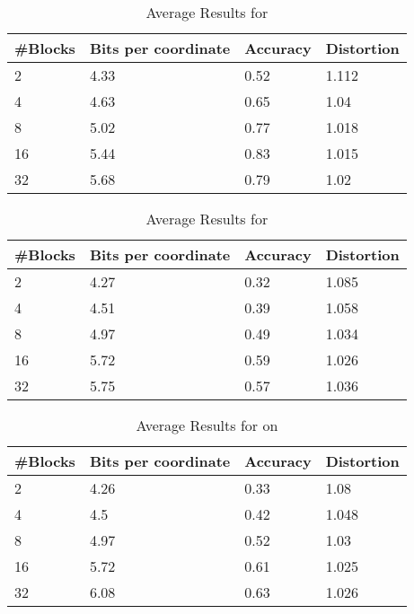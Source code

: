 \begin{table}[h!]
	\centering
	\caption{Average Results for \qsr{} \sift{}}
	\label{table:avg_sift_qsr}
	\begin{tabular}{l l l l}
		\hline
		\#Blocks & Bits per coordinate & Accuracy  & Distortion \\ \hline
		2 & 4.33 & 0.52 & 1.112  \\
		4 & 4.63 & 0.65 & 1.04  \\
		8 & 5.02 & 0.77 & 1.018 \\
		16 & 5.44 & 0.83 & 1.015 \\
		32 & 5.68 & 0.79 & 1.02 \\
		\hline
	\end{tabular}
\end{table}

\begin{table}[h!]
	\centering
	\caption{Average Results for \qs{} \clust{}}
	\label{table:avg_clust_qs}	
	\begin{tabular}{l l l l}
		\hline
		\#Blocks & Bits per coordinate & Accuracy  & Distortion \\ \hline
		2 & 4.27	& 0.32 & 1.085  \\
		4 & 4.51 & 0.39 & 1.058  \\
		8 & 4.97 & 0.49 & 1.034 \\
		16 & 5.72 & 0.59 & 1.026 \\
		32 & 5.75 & 0.57 & 1.036 \\
		\hline
	\end{tabular}
\end{table}

\begin{table}[h!]
	\centering
	\caption{Average Results for \qsr{} on \clust{}}
	\label{table:avg_clust_qsr}
	\begin{tabular}{l l l l}
		\hline
		\#Blocks & Bits per coordinate & Accuracy  & Distortion \\ \hline
		2 & 4.26 & 0.33 & 1.08  \\
		4 & 4.5 & 0.42 & 1.048  \\
		8 & 4.97 & 0.52 & 1.03 \\
		16 & 5.72 & 0.61 & 1.025 \\
		32 & 6.08 & 0.63 & 1.026 \\
		\hline
	\end{tabular}
\end{table}
